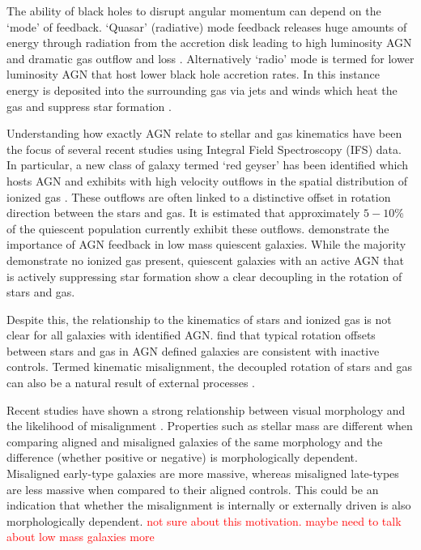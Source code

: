 \documentclass[fleqn,usenatbib]{mnras}
\newcommand{\red}[1]{{\textcolor{red}{#1}}}
\begin{document}
The ability of black holes to disrupt angular momentum can depend on the `mode' of feedback. `Quasar' (radiative) mode feedback releases huge amounts of energy through radiation from the accretion disk leading to high luminosity AGN and dramatic gas outflow and loss \citep[e.g.][]{cattaneo2009, rubin2014, cheung2016}. Alternatively `radio' mode is termed for lower luminosity AGN that host lower black hole accretion rates. In this instance energy is deposited into the surrounding gas via jets and winds which heat the gas and suppress star formation \citep[][]{binney1995, ciotti2001, heckman2014}.

Understanding how exactly AGN relate to stellar and gas kinematics have been the focus of several recent studies using Integral Field Spectroscopy (IFS) data. In particular, a new class of galaxy termed `red geyser' has been identified which hosts AGN and exhibits with high velocity outflows in the spatial distribution of ionized gas \citep[][]{cheung2016, roy2018}. These outflows are often linked to a distinctive offset in rotation direction between the stars and gas. It is estimated that approximately $5-10$\% of the quiescent population currently exhibit these outflows. \citet{penny2018} demonstrate the importance of AGN feedback in low mass quiescent galaxies. While the majority demonstrate no ionized gas present, quiescent galaxies with an active AGN that is actively suppressing star formation show a clear decoupling in the rotation of stars and gas. 

Despite this, the relationship to the kinematics of stars and ionized gas is not clear for all galaxies with identified AGN. \citet{ilha2019} find that typical rotation offsets between stars and gas in AGN defined galaxies are consistent with inactive controls. Termed kinematic misalignment, the decoupled rotation of stars and gas can also be a natural result of external processes \cite[e.g.][]{davis2011, barrera2015, vdvoort2015, chen2016, jin2016, starkenburg+19}.


Recent studies have shown a strong relationship between visual morphology and the likelihood of misalignment \citep[e.g. Duckworth et al. submitted,][]{chen2016, bryant2019}. Properties such as stellar mass are different when comparing aligned and misaligned galaxies of the same morphology and the difference (whether positive or negative) is morphologically dependent. Misaligned early-type galaxies are more massive, whereas misaligned late-types are less massive when compared to their aligned controls. This could be an indication that whether the misalignment is internally or externally driven is also morphologically dependent. \red{not sure about this motivation. maybe need to talk about low mass galaxies more}
\end{document}
